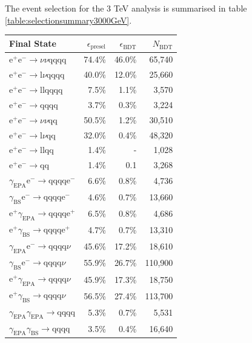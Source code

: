 The event selection for the 3 TeV analysis is summarised in table \ref{table:selectionsummary3000GeV}.
\begin{table}[h!]
\centering
\begin{tabular}{ l r r r }
\hline
Final State & $\epsilon_{\text{presel}}$ & $\epsilon_{\text{BDT}}$ & $N_{\text{BDT}}$ \\ 
\hline
$\text{e}^{+}\text{e}^{-} \rightarrow \nu{\nu}\text{qqqq}$ & 74.4\% & 46.0\% & 65,740 \\
$\text{e}^{+}\text{e}^{-} \rightarrow \text{l}\nu\text{qqqq}$ & 40.0\% & 12.0\% & 25,660 \\
$\text{e}^{+}\text{e}^{-} \rightarrow \text{llqqqq}$ & 7.5\% & 1.1\% & 3,570 \\
$\text{e}^{+}\text{e}^{-} \rightarrow \text{qqqq}$ & 3.7\% & 0.3\% & 3,224 \\
$\text{e}^{+}\text{e}^{-} \rightarrow \nu{\nu}\text{qq}$ & 50.5\% & 1.2\% & 30,510 \\
$\text{e}^{+}\text{e}^{-} \rightarrow \text{l}\nu\text{qq}$ & 32.0\% & 0.4\% & 48,320 \\
$\text{e}^{+}\text{e}^{-} \rightarrow \text{llqq}$ & 1.4\% & - & 1,028 \\
$\text{e}^{+}\text{e}^{-} \rightarrow \text{qq}$ & 1.4\% & 0.1 & 3,268 \\
$\gamma_{\text{EPA}}\text{e}^{-} \rightarrow \text{qqqq}\text{e}^{-}$ & 6.6\% & 0.8\% & 4,736 \\
$\gamma_{\text{BS}}\text{e}^{-} \rightarrow \text{qqqq}\text{e}^{-}$ & 4.6\% & 0.7\% & 13,660 \\
$\text{e}^{+}\gamma_{\text{EPA}} \rightarrow \text{qqqq}\text{e}^{+}$ & 6.5\% & 0.8\% & 4,686 \\
$\text{e}^{+}\gamma_{\text{BS}} \rightarrow \text{qqqq}\text{e}^{+}$ & 4.7\% & 0.7\% & 13,310 \\
$\gamma_{\text{EPA}}\text{e}^{-} \rightarrow \text{qqqq}\nu$ & 45.6\% & 17.2\% & 18,610 \\
$\gamma_{\text{BS}}\text{e}^{-} \rightarrow \text{qqqq}\nu$ & 55.9\% & 26.7\% & 110,900 \\
$\text{e}^{+}\gamma_{\text{EPA}} \rightarrow \text{qqqq}\nu$ & 45.9\% & 17.3\% & 18,750 \\
$\text{e}^{+}\gamma_{\text{BS}} \rightarrow \text{qqqq}\nu$ & 56.5\% & 27.4\% & 113,700 \\
$\gamma_{\text{EPA}}\gamma_{\text{EPA}} \rightarrow \text{qqqq}$ & 5.3\% & 0.7\% & 5,531 \\
$\gamma_{\text{EPA}}\gamma_{\text{BS}} \rightarrow \text{qqqq}$ & 3.5\% & 0.4\% & 16,640 \\

\end{tabular}
\end{table}

